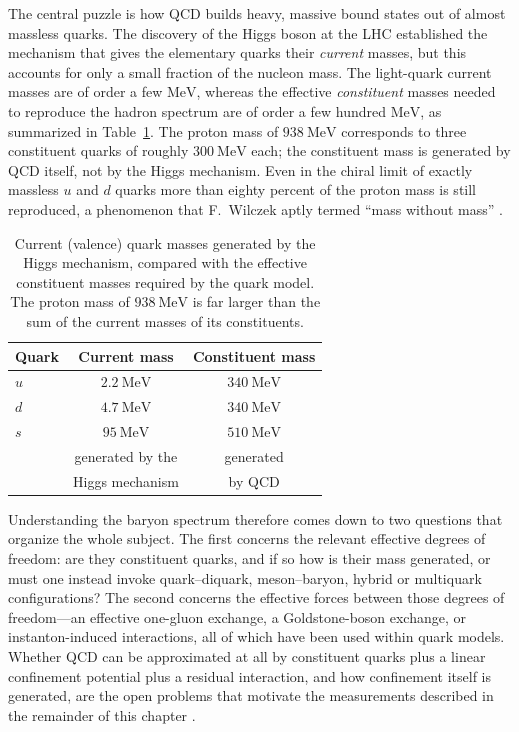The central puzzle is how QCD builds heavy, massive bound states out of almost massless
quarks. The discovery of the Higgs boson at the LHC established the mechanism that gives
the elementary quarks their \emph{current} masses, but this accounts for only a small
fraction of the nucleon mass. The light-quark current masses are of order a few
$\mathrm{MeV}$, whereas the effective \emph{constituent} masses needed to reproduce the
hadron spectrum are of order a few hundred $\mathrm{MeV}$, as summarized in
Table~\ref{tab:quark-masses}. The proton mass of $938~\mathrm{MeV}$ corresponds to three
constituent quarks of roughly $300~\mathrm{MeV}$ each; the constituent mass is generated by
QCD itself, not by the Higgs mechanism. Even in the chiral limit of exactly massless $u$
and $d$ quarks more than eighty percent of the proton mass is still reproduced, a
phenomenon that F.~Wilczek aptly termed ``mass without mass'' \cite[Ch.~15]{Amsler2018}.

\begin{table}[t]
    \centering
    \begin{tabular}{lcc}
        \hline
        Quark & Current mass & Constituent mass \\
        \hline
        $u$ & $2.2~\mathrm{MeV}$ & $340~\mathrm{MeV}$ \\
        $d$ & $4.7~\mathrm{MeV}$ & $340~\mathrm{MeV}$ \\
        $s$ & $95~\mathrm{MeV}$  & $510~\mathrm{MeV}$ \\
        \hline
        & generated by the & generated \\
        & Higgs mechanism  & by QCD \\
        \hline
    \end{tabular}
    \caption{Current (valence) quark masses generated by the Higgs mechanism, compared with
    the effective constituent masses required by the quark model. The proton mass of
    $938~\mathrm{MeV}$ is far larger than the sum of the current masses of its
    constituents.}
    \label{tab:quark-masses}
\end{table}

Understanding the baryon spectrum therefore comes down to two questions that organize the
whole subject. The first concerns the relevant effective degrees of freedom: are they
constituent quarks, and if so how is their mass generated, or must one instead invoke
quark--diquark, meson--baryon, hybrid or multiquark configurations? The second concerns the
effective forces between those degrees of freedom---an effective one-gluon exchange, a
Goldstone-boson exchange, or instanton-induced interactions, all of which have been used
within quark models. Whether QCD can be approximated at all by constituent quarks plus a
linear confinement potential plus a residual interaction, and how confinement itself is
generated, are the open problems that motivate the measurements described in the remainder
of this chapter \cite[Ch.~15]{Amsler2018}.

